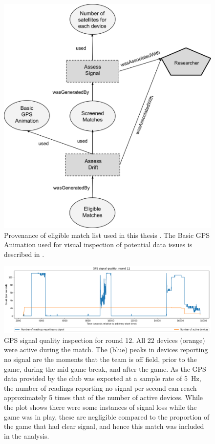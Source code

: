 \begin{figure}[H]
\centering
\includegraphics[width=0.8\linewidth]{figs/prov/prov-2.png}
\caption{Provenance of eligible \afl{} match list used in this thesis \notationdetails{}. The Basic GPS Animation used for visual inspection of potential data issues is described in .
\label{fig:prov2}}
\end{figure}

\begin{figure}[htbp]
\centering
\includegraphics[width=\linewidth]{figs/model/geelong_gps_qual_r12.png}
\caption{GPS signal quality inspection for round 12. All 22 devices (orange) were active during the match. The (blue) peaks in devices reporting no signal are the moments that the team is off field, prior to the game, during the mid-game break, and after the game. As the GPS data provided by the club was exported at a sample rate of 5~Hz, the number of readings reporting no signal per second can reach approximately 5 times that of the number of active devices. While the plot shows there were some instances of signal loss while the game was in play, these are negligible compared to the proportion of the game that had clear signal, and hence this match was included in the analysis.}
\label{fig:gps-qual-example}
\end{figure}

